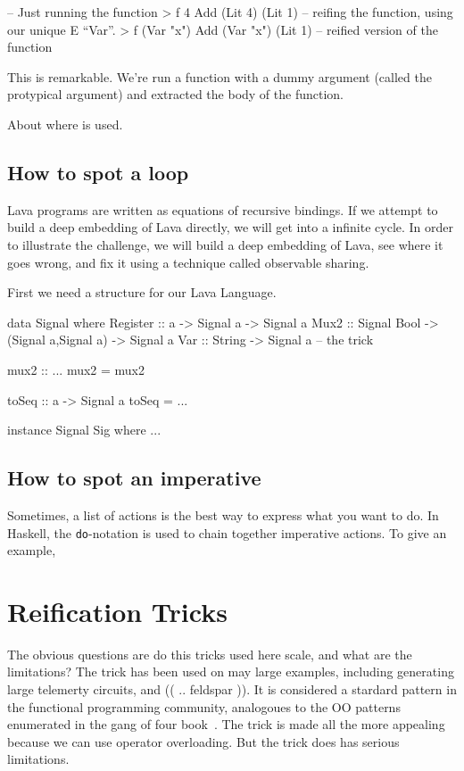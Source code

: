 \documentclass[11pt]{article}
\begin{document}
\begin{Code}
-- Just running the function
> f 4
Add (Lit 4) (Lit 1)
-- reifing the function, using our unique E ``Var''.
> f (Var "x")
Add (Var "x") (Lit 1)   -- reified version of the function
\end{Code}

This is remarkable. We're run a function with 
a dummy argument (called the protypical argument)
and extracted the body of the function.

About where is used.

\subsection{How to spot a loop}

Lava programs are written as equations of recursive bindings.
If we attempt to build a deep embedding of Lava directly,
we will get into a infinite cycle. In order to illustrate
the challenge, we will build a deep embedding of Lava,
see where it goes wrong, and fix it using a technique called
observable sharing.

First we need a structure for our Lava Language.
\begin{Code}
        
data Signal where
  Register :: a -> Signal a                      -> Signal a
  Mux2     :: Signal Bool -> (Signal a,Signal a) -> Signal a
  Var      :: String                             -> Signal a -- the trick

mux2 :: ...
mux2 = mux2

toSeq :: a -> Signal a
toSeq = ...

instance Signal Sig where {...}

\end{Code}

\subsection{How to spot an imperative}

Sometimes, a list of actions is the best way to express what you want to do.
In Haskell, the \verb|do|-notation is used to chain together imperative actions.
To give an example, 

\section{Reification Tricks}

The obvious questions are do this tricks used here scale,
and what are the limitations? The trick has
been used on may large examples, including
generating large telemerty circuits, 
and (( .. feldspar )). It is considered a
stardard pattern in the functional programming
community, analogoues to the OO patterns
enumerated in the gang of four book~\cite{..}.
The trick is made all the more appealing
because we can use operator overloading.
But the trick does has serious limitations.
\end{document}
